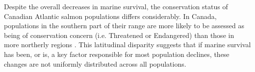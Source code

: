\documentclass[12pt]{article}
\begin{document}


Despite the overall decreases in marine survival,
the conservation status of Canadian Atlantic salmon populations differs
considerably. In Canada, populations in the southern part of their range are more
likely to be assessed as being of conservation concern (i.e. Threatened or Endangered) 
than those in more
northerly regions \citep{Cosewic2010}. This latitudinal disparity 
suggests that if marine survival has been, or is, a key factor responsible for
most population declines, these changes are not uniformly distributed across
all populations. 


\end{document}
